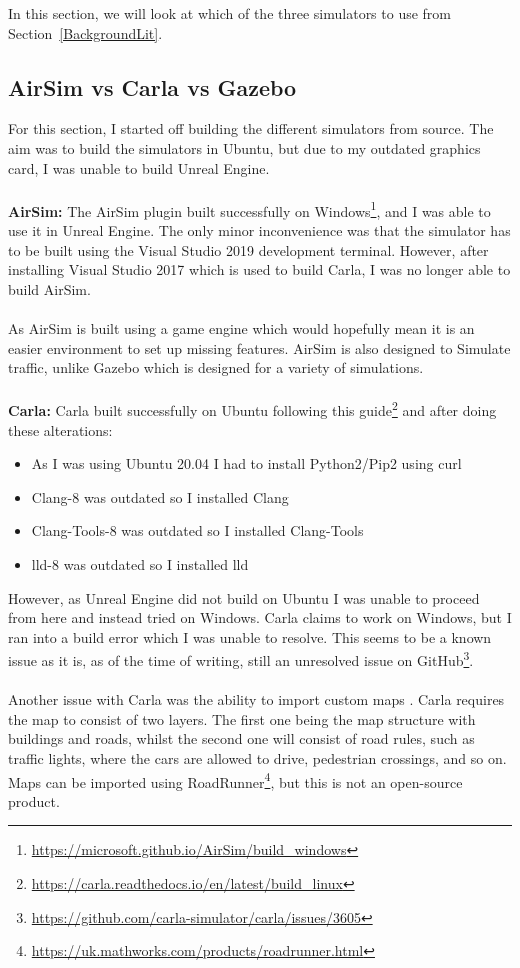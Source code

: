 In this section, we will look at which of the three simulators to use from Section~\ref{BackgroundLit}.%

\subsection{AirSim vs Carla vs Gazebo}
For this section, I started off building the different simulators from source. The aim was to build the simulators in Ubuntu, but due to my outdated graphics card, I was unable to build Unreal Engine.
\\~\\
\textbf{AirSim:} The AirSim plugin built successfully on Windows\footnote{\url{https://microsoft.github.io/AirSim/build_windows}}, and I was able to use it in Unreal Engine. The only minor inconvenience was that the simulator has to be built using the Visual Studio 2019 development terminal. However, after installing Visual Studio 2017 which is used to build Carla, I was no longer able to build AirSim. 
\\~\\
As AirSim is built using a game engine which would hopefully mean it is an easier environment to set up missing features. AirSim is also designed to Simulate traffic, unlike Gazebo which is designed for a variety of simulations. 
\\~\\
\textbf{Carla:} Carla built successfully on Ubuntu following this guide\footnote{\url{https://carla.readthedocs.io/en/latest/build_linux}} and after doing these alterations:
\begin{itemize}
    \item As I was using Ubuntu 20.04 I had to install Python2/Pip2 using curl
\item Clang-8 was outdated so I installed Clang
\item Clang-Tools-8 was outdated so I installed Clang-Tools
\item lld-8 was outdated so I installed lld
\end{itemize}
However, as Unreal Engine did not build on Ubuntu I was unable to proceed from here and instead tried on Windows. Carla claims to work on Windows, but I ran into a build error which I was unable to resolve. This seems to be a known issue as it is, as of the time of writing, still an unresolved issue on GitHub\footnote{\url{https://github.com/carla-simulator/carla/issues/3605}}. 
\\~\\
Another issue with Carla was the ability to import custom maps \cite{Carlamap}. Carla requires the map to consist of two layers. The first one being the map structure with buildings and roads, whilst the second one will consist of road rules, such as traffic lights, where the cars are allowed to drive, pedestrian crossings, and so on. Maps can be imported using RoadRunner\footnote{\url{https://uk.mathworks.com/products/roadrunner.html}}, but this is not an open-source product.
